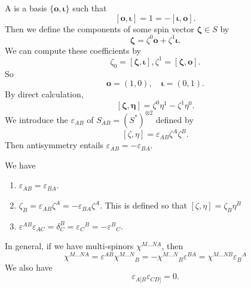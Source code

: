 \documentclass[a4paper]{article}
\newcommand\omicron{o}
\begin{document}
A  is a basis $\{\boldsymbol\omicron, \boldsymbol\iota\}$ such that
\[
  [\boldsymbol\omicron, \boldsymbol\iota] = 1 = - [\boldsymbol\iota, \boldsymbol\omicron].
\]
Then we define the components of some spin vector $\boldsymbol\zeta \in S$ by
\[
  \boldsymbol\zeta = \zeta^0 \boldsymbol\omicron + \zeta^1 \boldsymbol\iota.
\]
We can compute these coefficients by
\[
  \zeta_0 = [\boldsymbol\zeta, \boldsymbol\iota], \zeta^1 = [\boldsymbol\zeta, \boldsymbol\omicron].
\]
So
\[
  \boldsymbol\omicron = (1, 0),\quad \boldsymbol\iota = (0, 1).
\]
By direct calculation,
\[
  [\boldsymbol\zeta, \boldsymbol\eta] = \zeta^0 \eta^1 - \zeta^1 \eta^0.
\]
We introduce the  $\varepsilon_{AB}$ of $S_{AB} = (S^*)^{\otimes 2}$ defined by
\[
  [\zeta, \eta] = \varepsilon_{AB} \zeta^A \zeta^B.
\]
Then antisymmetry entails $\varepsilon_{AB} = - \varepsilon_{BA}$.
\begin{prop}
  We have
  \begin{enumerate}
    \item $\varepsilon_{AB} = \varepsilon_{BA}$.
    \item $\zeta_B = \varepsilon_{AB} \zeta^A = - \varepsilon_{BA} \zeta^A$. This is defined so that $[\zeta, \eta] = \zeta_B \eta^B$
    \item $\varepsilon^{AB} \varepsilon_{AC} = \delta^B_C = \varepsilon_C\!^B = - \varepsilon^B\!_C$.
  \end{enumerate}
\end{prop}
In general, if we have multi-spinors $\chi^{M\ldots NA}$, then
\[
  \chi^{M\ldots NA} = \varepsilon^{AB} \chi^{M\ldots N}\!_B = - \chi^{M\ldots N}\!_B \varepsilon^{BA} = \chi^{M\ldots NB} \varepsilon_B\!^A
\]
We also have
\[
  \varepsilon_{A[B} \varepsilon_{CD]} = 0.
\]

\printindex
\end{document}
